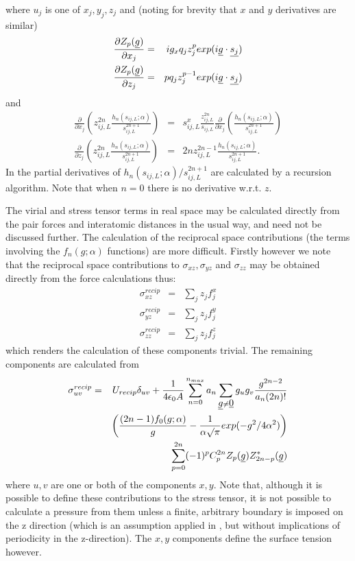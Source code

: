where $u_{j}$ is one of $x_{j},y_{j},z_{j}$ and (noting for brevity
that $x$ and $y$ derivatives are similar)
\begin{eqnarray}
\frac{\partial Z_{p}(\mbox{$\underline{g}$})}{\partial x_{j}}&=&ig_{x}q_{j}z_{j}^{p}
exp(i\mbox{$\underline{g}$}\cdot\mbox{$\underline{s_{j}}$}) \nonumber \\
\frac{\partial Z_{p}(\mbox{$\underline{g}$})}{\partial z_{j}}&=&pq_{j}z_{j}^{p-1}
exp(i\mbox{$\underline{g}$}\cdot\mbox{$\underline{s_{j}}$})
\end{eqnarray}
and 
\begin{eqnarray}
\frac{\partial}{\partial x_{j}}\left ( z_{ij,L}^{2n} 
\frac{h_{n}(s_{ij,L};\alpha)}{s_{ij,L}^{2n+1}} \right )&=&
s_{ij,L}^{x}\frac{z_{ij,L}^{2n} }{s_{ij,L}}
\frac{\partial}{\partial x_{j}}\left
(\frac{h_{n}(s_{ij,L};\alpha)}{s_{ij,L}^{2n+1}} \right ) 
\nonumber \\
\frac{\partial}{\partial z_{j}}\left ( z_{ij,L}^{2n} 
\frac{h_{n}(s_{ij,L};\alpha)}{s_{ij,L}^{2n+1}} \right )&=&
2n z_{ij,L}^{2n-1} \frac{h_{n}(s_{ij,L};\alpha)}{s_{ij,L}^{2n+1}}. 
\end{eqnarray}
In \D{} the partial derivatives of
$h_{n}(s_{ij,L};\alpha)/s_{ij,L}^{2n+1}$
are calculated by a recursion algorithm. Note that when $n=0$ there is
no derivative w.r.t. $z$.

The virial and stress tensor terms in real space may be calculated
directly from the pair forces and interatomic distances in the usual
way, and need not be discussed further.  The calculation of the
reciprocal space contributions (the terms involving the
$f_{n}(g;\alpha)$ functions) are more difficult. Firstly however we
note that the reciprocal space contributions to $\sigma_{xz},\sigma_{yz}$ and
$\sigma_{zz}$ may be obtained directly from the force calculations
thus:
\begin{eqnarray}
	\sigma^{recip}_{xz}&=&\sum_{j} z_{j}f_{j}^{x} \nonumber \\
	\sigma^{recip}_{yz}&=&\sum_{j} z_{j}f_{j}^{y} \\
	\sigma^{recip}_{zz}&=&\sum_{j} z_{j}f_{j}^{z} \nonumber
\end{eqnarray}
which renders the calculation of these components trivial. The 
remaining components are calculated from
\begin{eqnarray}
\sigma^{recip}_{uv}&=&U_{recip}\delta_{uv}+\frac{1}{4\epsilon_{0}A}
\sum_{n=0}^{n_{max}} a_{n}
\sum_{\mbox{$\underline{g}$}\ne \mbox{$\underline{0}$}} g_{u}g_{v}\frac{g^{2n-2}}{a_{n}(2n)!} \nonumber \\
 & & \left
 (\frac{(2n-1)f_{0}(g;\alpha)}{g}-\frac{1}{\alpha\surd{\pi}}exp(-g^{2}/4\alpha^{2})\right
 )  \\
 & & \sum_{p=0}^{2n}(-1)^{p}C_{p}^{2n}Z_{p}(\mbox{$\underline{g}$})Z_{2n-p}^{*}(\mbox{$\underline{g}$})
\nonumber 
\end{eqnarray}
where $u,v$ are one or both of the components $x,y$.  Note that,
although it is possible to define these contributions to the stress
tensor, it is not possible to calculate a pressure from them unless a
finite, arbitrary boundary is imposed on the z direction (which is an
assumption applied in \D{}, but without implications of periodicity in
the z-direction). The $x,y$ components define the surface tension
however.

